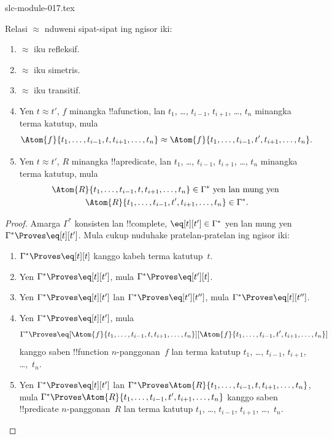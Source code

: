 \begin{filecontents*}[overwrite]{slc-module-017.tex}
\begin{prop}
Relasi $\approx$ nduweni sipat-sipat ing ngisor iki:
\begin{enumerate}
\item $\approx$ iku refleksif.
\item $\approx$ iku simetris.
\item $\approx$ iku transitif.
\item Yen $t \approx t'$, $f$ minangka !!a{function}, lan $t_1$,
  \dots, $t_{i-1}$, $t_{i+1}$, \dots, $t_n$ minangka terma katutup,
  mula
\[
\Atom{f}{t_1,\dots, t_{i-1}, t, t_{i+1}, \dots, t_n} \approx
\Atom{f}{t_1,\dots, t_{i-1}, t', t_{i+1}, \dots, t_n}.
\]
\item Yen $t \approx t'$, $R$ minangka !!a{predicate}, lan $t_1$,
  \dots, $t_{i-1}$, $t_{i+1}$, \dots, $t_n$ minangka terma katutup,
  mula
\begin{multline*}
\Atom{R}{t_1,\dots, t_{i-1}, t, t_{i+1}, \dots, t_n} \in \Gamma^* \text{ yen lan mung yen } \\
\Atom{R}{t_1,\dots, t_{i-1}, t', t_{i+1}, \dots, t_n} \in \Gamma^*.
\end{multline*}
\end{enumerate}
\end{prop}

\begin{proof}
Amarga $\Gamma^*$ konsisten lan !!{complete}, $\eq[t][t'] \in
\Gamma^*$ yen lan mung yen $\Gamma^* \Proves \eq[t][t']$. Mula cukup
nuduhake pratelan-pratelan ing ngisor iki:
\begin{enumerate}
\item $\Gamma^* \Proves \eq[t][t]$ kanggo kabeh terma katutup~$t$.
\item Yen $\Gamma^* \Proves \eq[t][t']$, mula $\Gamma^* \Proves
  \eq[t'][t]$.
\item Yen $\Gamma^* \Proves \eq[t][t']$ lan $\Gamma^* \Proves
  \eq[t'][t'']$, mula $\Gamma^* \Proves \eq[t][t'']$.
\item Yen $\Gamma^* \Proves \eq[t][t']$, mula
\[
\Gamma^* \Proves
\eq[\Atom{f}{t_1,\dots,t_{i-1},t,t_{i+1},\dots,t_n}][\Atom{f}{t_1,\dots,t_{i-1},t',t_{i+1},\dots,t_n}]
\]
kanggo saben !!{function} $n$-panggonan~$f$ lan terma katutup
$t_1$, \dots, $t_{i-1}$, $t_{i+1}$, \dots,~$t_n$.
\item Yen $\Gamma^* \Proves \eq[t][t']$ lan
$\Gamma^* \Proves
\Atom{R}{t_1,\dots,t_{i-1},t,t_{i+1},\dots,t_n}$, mula
$\Gamma^* \Proves \Atom{R}{t_1,\dots,t_{i-1},t',t_{i+1},\dots,t_n}$
kanggo saben !!{predicate} $n$-panggonan~$R$ lan terma katutup
$t_1$, \dots, $t_{i-1}$, $t_{i+1}$, \dots,~$t_n$.
\end{enumerate}
\end{proof}


\end{filecontents*}

